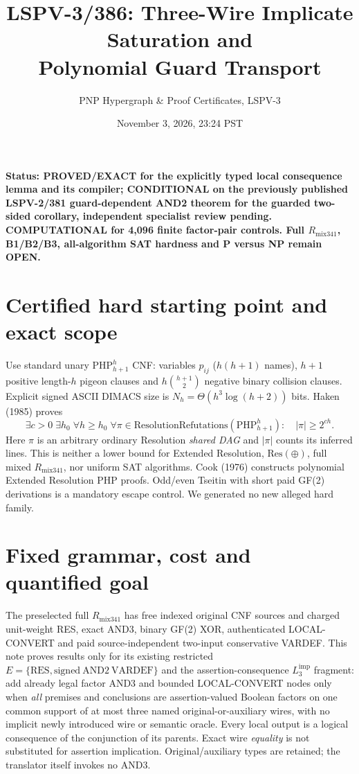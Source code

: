 \documentclass[11pt]{article}
\title{LSPV-3/386: Three-Wire Implicate Saturation and\\Polynomial Guard Transport}
\author{PNP Hypergraph \& Proof Certificates, LSPV-3}
\date{November 3, 2026, 23:24 PST}
\begin{document}
\maketitle
\noindent\textbf{Status: PROVED/EXACT for the explicitly typed local consequence lemma and its compiler; CONDITIONAL on the previously published LSPV-2/381 guard-dependent AND2 theorem for the guarded two-sided corollary, independent specialist review pending. COMPUTATIONAL for 4,096 finite factor-pair controls. Full $R_{\mathrm{mix341}}$, B1/B2/B3, all-algorithm SAT hardness and P versus NP remain OPEN.}

\section*{Certified hard starting point and exact scope}
Use standard unary $\mathrm{PHP}_{h+1}^{h}$ CNF: variables $p_{ij}$ ($h(h+1)$ names), $h+1$ positive length-$h$ pigeon clauses and $h\binom{h+1}{2}$ negative binary collision clauses. Explicit signed ASCII DIMACS size is $N_h=\Theta(h^3\log(h+2))$ bits. Haken (1985) proves
\[
\exists c>0\;\exists h_0\;\forall h\ge h_0\;\forall\pi\in
\mathrm{ResolutionRefutations}(\mathrm{PHP}_{h+1}^{h}):
\quad|\pi|\ge2^{ch}.
\]
Here $\pi$ is an arbitrary ordinary Resolution \emph{shared DAG} and $|\pi|$ counts its inferred lines. This is neither a lower bound for Extended Resolution, $\mathrm{Res}(\oplus)$, full mixed $R_{\mathrm{mix341}}$, nor uniform SAT algorithms. Cook (1976) constructs polynomial Extended Resolution PHP proofs. Odd/even Tseitin with short paid GF(2) derivations is a mandatory escape control. We generated no new alleged hard family.

\section*{Fixed grammar, cost and quantified goal}
The preselected full $R_{\mathrm{mix341}}$ has free indexed original CNF sources and charged unit-weight RES, exact AND3, binary GF(2) XOR, authenticated LOCAL-CONVERT and paid source-independent two-input conservative VARDEF. This note proves results only for its existing restricted $E=\{\mathrm{RES},\mathrm{signed\ AND2\ VARDEF}\}$ and the assertion-consequence $L_3^{\mathrm{imp}}$ fragment: add already legal factor AND3 and bounded LOCAL-CONVERT nodes only when \emph{all} premises and conclusions are assertion-valued Boolean factors on one common support of at most three named original-or-auxiliary wires, with no implicit newly introduced wire or semantic oracle. Every local output is a logical consequence of the conjunction of its parents. Exact wire \emph{equality} is not substituted for assertion implication. Original/auxiliary types are retained; the translator itself invokes no AND3.
\end{document}
